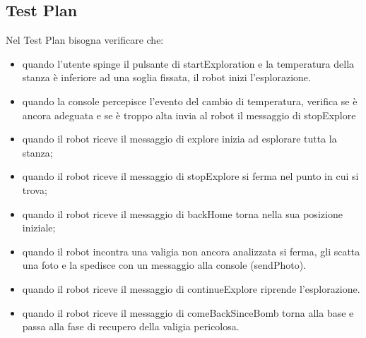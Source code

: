 \subsection{Test Plan}
Nel Test Plan bisogna verificare che:
\begin{itemize}

    \item quando l'utente spinge il pulsante di startExploration e la temperatura della stanza è inferiore ad una soglia fissata, il robot inizi l'esplorazione.
    
     \item quando la console percepisce l'evento del cambio di temperatura, verifica se è ancora adeguata e se è troppo alta invia al robot il messaggio di stopExplore
    
    \item quando il robot riceve il messaggio di explore inizia ad esplorare tutta la stanza;
    
    \item quando il robot riceve il messaggio di stopExplore si ferma nel punto in cui si trova;
     
    \item quando il robot riceve il messaggio di backHome torna nella sua posizione iniziale;
    
    \item quando il robot incontra una valigia non ancora analizzata si ferma, gli scatta una foto e la spedisce con un messaggio alla console (sendPhoto). 
    
    \item quando il robot riceve il messaggio di continueExplore riprende l'esplorazione.
    
    \item quando il robot riceve il messaggio di comeBackSinceBomb torna alla base e passa alla fase di recupero della valigia pericolosa.
    
 
\end{itemize}







    


